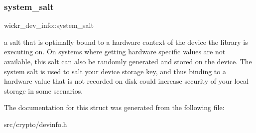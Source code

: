 \subsubsection{\texorpdfstring{system\+\_\+salt}{system\_salt}}
{\footnotesize\ttfamily wickr\+\_\+dev\+\_\+info\+::system\+\_\+salt}

a salt that is optimally bound to a hardware context of the device the library is executing on. On systems where getting hardware specific values are not available, this salt can also be randomly generated and stored on the device. The system salt is used to salt your device storage key, and thus binding to a hardware value that is not recorded on disk could increase security of your local storage in some scenarios. 

The documentation for this struct was generated from the following file\+:\begin{DoxyCompactItemize}
\item 
src/crypto/devinfo.\+h\end{DoxyCompactItemize}

